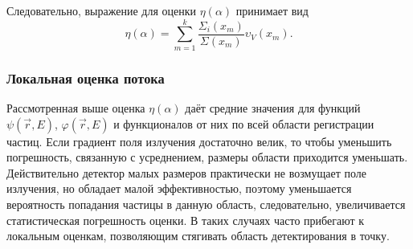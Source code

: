 \documentclass[
11pt,
master, %
subf, %
href, %
colorlinks=true, %
]{disser}
\begin{document}
Следовательно, выражение для оценки $\eta (\alpha )$ принимает вид
\begin{equation} \label{GrindEQ__22_}
\eta (\alpha )=\sum _{m=1}^{k}\frac{\Sigma _{i} (x_{m} )}{\Sigma (x_{m} )} \upsilon _{V} (x_{m} ) .
\end{equation}

\subsubsection{Локальная оценка потока}

Рассмотренная выше оценка $\eta (\alpha )$ даёт средние значения для функций $\psi \left(\vec{r},E\right)$, $\varphi \left(\vec{r},E\right)$ и функционалов от них по всей области регистрации частиц. Если градиент поля излучения достаточно велик, то чтобы уменьшить погрешность, связанную с усреднением, размеры области приходится уменьшать. Действительно детектор малых размеров практически не возмущает поле излучения, но обладает малой эффективностью, поэтому уменьшается вероятность попадания частицы в данную область, следовательно, увеличивается статистическая погрешность оценки. В таких случаях часто прибегают к локальным оценкам, позволяющим стягивать область детектирования в точку.
\end{document}
